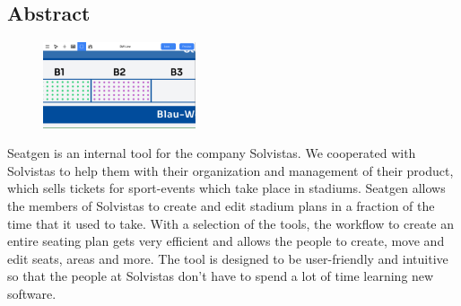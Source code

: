 \begin{spacing}{1}
    \chapter*{Abstract}
\end{spacing}
\begin{figure}
    \begin{center}
      \includegraphics[width=0.4\textwidth]{pics/abstract.png}
    \end{center}
\end{figure}
Seatgen is an internal tool for the company Solvistas. We cooperated with Solvistas to help them with their organization and management of their product, which sells tickets for sport-events which take place in stadiums. Seatgen allows the members of Solvistas to create and edit stadium plans in a fraction of the time that it used to take. With a selection of the tools, the workflow to create an entire seating plan gets very efficient and allows the people to create, move and edit seats, areas and more. The tool is designed to be user-friendly and intuitive so that the people at Solvistas don't have to spend a lot of time learning new software.
\newpage

